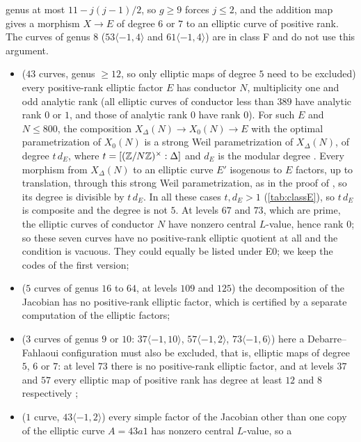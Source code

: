 genus at most $11-j(j-1)/2$, so $g\ge9$ forces $j\le2$, and the addition map gives a morphism $X\to E$ of degree $6$
or $7$ to an elliptic curve of positive rank. The curves of genus $8$ ($53\langle-1,4\rangle$ and
$61\langle-1,4\rangle$) are in class F and do not use this argument.
\begin{itemize}
\item[E] ($43$ curves, genus $\ge12$, so only elliptic maps of degree $5$ need to be excluded) every positive-rank elliptic factor $E$ has conductor $N$, multiplicity one
 and odd analytic rank (all elliptic curves of conductor less than $389$ have analytic rank $0$ or $1$, and those of
 analytic rank $0$ have rank $0$). For such $E$ and $N\le800$, the composition $X_\Delta(N)\to X_0(N)\to E$ with the optimal
 parametrization of $X_0(N)$ is a strong Weil parametrization of $X_\Delta(N)$, of degree $t\,d_E$, where
 $t=[(\mathbb{Z}/N\mathbb{Z})^\times:\Delta]$ and $d_E$ is the modular degree \cite[Corollary~4.10]{DerickxOrlic2026}. Every morphism
 from $X_\Delta(N)$ to an elliptic curve $E'$ isogenous to $E$ factors, up to translation, through this strong Weil
 parametrization, as in the proof of \cite[Corollary~4.12]{DerickxOrlic2026}, so its degree is divisible by
 $t\,d_E$. In all these cases $t,d_E>1$ (\cref{tab:classE}), so $t\,d_E$ is composite and the degree is not $5$.
 At levels $67$ and $73$, which are prime, the elliptic curves of conductor $N$ have nonzero central $L$-value,
 hence rank $0$; so these seven curves have no positive-rank elliptic
 quotient at all and the condition is vacuous. They could equally be listed under E0; we keep the codes of the
 first version;
\item[E0] ($5$ curves of genus $16$ to $64$, at levels $109$ and $125$) the decomposition of the Jacobian has
 no positive-rank elliptic factor, which is certified by a separate computation of the elliptic factors;
\item[D] ($3$ curves of genus $9$ or $10$: $37\langle-1,10\rangle$, $57\langle-1,2\rangle$, $73\langle-1,6\rangle$)
 here a Debarre--Fahlaoui configuration must also be excluded, that is, elliptic maps of degree $5$, $6$ or $7$:
 at level $73$ there is no positive-rank elliptic factor, and at levels $37$ and $57$ every elliptic map of
 positive rank has degree at least $12$ and $8$ respectively \cite[Corollary~4.10]{DerickxOrlic2026};
\item[C] ($1$ curve, $43\langle-1,2\rangle$) every simple factor of the Jacobian other than one copy of the elliptic
 curve $A=43a1$ has nonzero central $L$-value, so a

\end{itemize}
